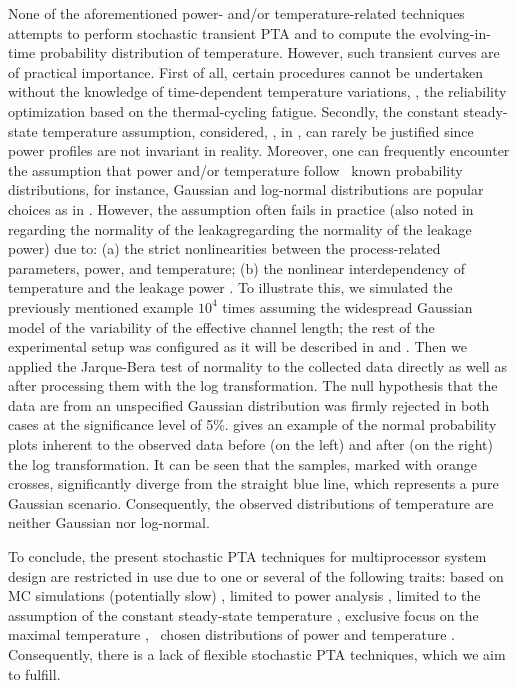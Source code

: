 
None of the aforementioned power- and/or temperature-related techniques attempts to perform stochastic transient PTA and to compute the evolving-in-time probability distribution of temperature.
However, such transient curves are of practical importance.
First of all, certain procedures cannot be undertaken without the knowledge of time-dependent temperature variations, \eg, the reliability optimization based on the thermal-cycling fatigue. Secondly, the constant steady-state temperature assumption, considered, \eg, in \cite{juan2011, juan2012}, can rarely be justified since power profiles are not invariant in reality.
Moreover, one can frequently encounter the assumption that power and/or temperature follow \apriori\ known probability distributions, for instance, Gaussian and log-normal distributions are popular choices as in \cite{srivastava2010, juan2012, bhardwaj2006}.
However, the assumption often fails in practice (also noted in \cite{juan2012} regarding the normality of the leakagregarding the normality of the leakage power) due to: (a) the strict nonlinearities between the process-related parameters, power, and temperature; (b) the nonlinear interdependency of temperature and the leakage power \cite{liu2007}.
To illustrate this, we simulated the previously mentioned example $10^4$ times assuming the widespread Gaussian model of the variability of the effective channel length; the rest of the experimental setup was configured as it will be described in  and .
Then we applied the Jarque-Bera test of normality to the collected data directly as well as after processing them with the log transformation.
The null hypothesis that the data are from an unspecified Gaussian distribution was firmly rejected in both cases at the significance level of 5\%.
 gives an example of the normal probability plots inherent to the observed data before (on the left) and after (on the right) the log transformation.
It can be seen that the samples, marked with orange crosses, significantly diverge from the straight blue line, which represents a pure Gaussian scenario.
Consequently, the observed distributions of temperature are neither Gaussian nor log-normal.

To conclude, the present stochastic PTA techniques for multiprocessor system design are restricted in use due to one or several of the following traits: based on MC simulations (potentially slow) \cite{chandra2010}, limited to power analysis \cite{chandra2010, shen2009, bhardwaj2006, ghanta2006}, limited to the assumption of the constant steady-state temperature \cite{juan2011, juan2012}, exclusive focus on the maximal temperature \cite{juan2011}, \apriori\ chosen distributions of power and temperature \cite{srivastava2010, juan2012, bhardwaj2006}.
Consequently, there is a lack of flexible stochastic PTA techniques, which we aim to fulfill.

